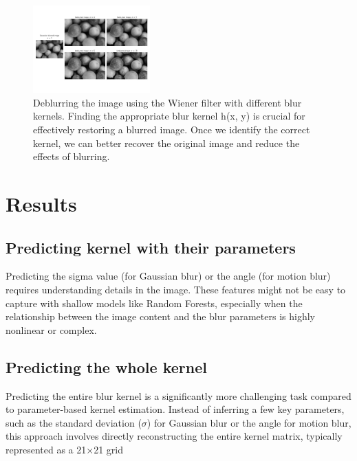\documentclass[twoside,11pt]{article}
\begin{document}
\begin{figure}[!ht]
\centering
\includegraphics[width=0.4\textwidth]{figure7.jpg}
\caption{Deblurring the image using the Wiener filter with different blur kernels. 
Finding the appropriate blur kernel  h(x, y)  is crucial for effectively restoring a blurred image. Once we identify the correct kernel, we can better recover the original image and reduce the effects of blurring.}
\end{figure}

\FloatBarrier 

\section{Results}
\subsection{Predicting kernel with their parameters}
Predicting the sigma value (for Gaussian blur) or the angle (for motion blur) requires understanding details in the image. These features might not be easy to capture with shallow models like Random Forests, especially when the relationship between the image content and the blur parameters is highly nonlinear or complex. 

\subsection{Predicting the whole kernel}
Predicting the entire blur kernel is a significantly more challenging task compared to parameter-based kernel estimation. Instead of inferring a few key parameters, such as the standard deviation (\( \sigma \)) for Gaussian blur or the angle for motion blur, this approach involves directly reconstructing the entire kernel matrix, typically represented as a 21×21 grid
\end{document}
